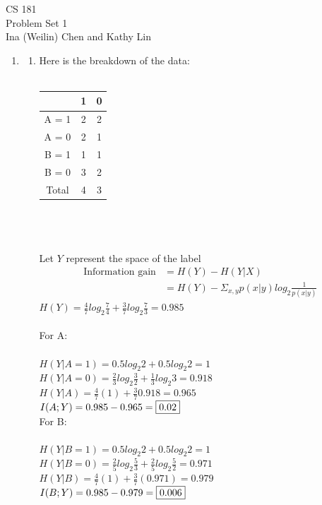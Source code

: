\documentclass[12pt]{article}
\begin{document}
\begin{center}
CS 181\\
Problem Set 1\\
Ina (Weilin) Chen and Kathy Lin
\end{center}

\begin{enumerate}

	\item 
		\begin{enumerate}
			\item Here is the breakdown of the data:\\\\
				\begin{tabular}{|c|c|c|}
        				\hline
        				~            & 1 & 0 \\ \hline
        				A = 1 & 2      & 2      \\ 
        				A = 0 & 2      & 1      \\
        				\hline
        				B = 1 & 1      & 1      \\ 
        				B = 0 & 3      & 2      \\
        				\hline
					Total & 4      & 3      \\
        				\hline
    				\end{tabular}
\\\\\\Let $Y$ represent the space of the label
				\begin{align*}\text{Information gain} &= H(Y) - H(Y|X)\\
							& = H(Y) -\Sigma_{x,y}p(x|y)log_{2}\frac{1}{p(x|y)}\end{align*}
				$H(Y) = \frac{4}{7}log_{2}\frac{7}{4} + \frac{3}{7}log_{2}\frac{7}{3} = 0.985$\\\\
				For A:\\\\
				$H(Y|A = 1) = 0.5log_{2}2 + 0.5log_{2}2 = 1$\\
				$H(Y|A = 0) = \frac{2}{3}log_{2}\frac{3}{2} + \frac{1}{3}log_{2}3 = 0.918$\\
				$H(Y|A) = \frac{4}{7}(1) + \frac{3}{7}0.918 = 0.965$\\
				$I(A ; Y) = 0.985 - 0.965 = \fbox{0.02}$\\

				For B:\\\\
				$H(Y|B = 1) = 0.5log_{2}2 + 0.5log_{2}2 = 1$\\
				$H(Y|B = 0) = \frac{2}{5}log_{2}\frac{5}{3} + \frac{2}{5}log_{2}\frac{5}{2} = 0.971$\\
				$H(Y|B) = \frac{4}{7}(1) + \frac{3}{7}(0.971) = 0.979$\\
				$I(B ; Y) = 0.985 - 0.979 = \fbox{0.006}$\\


\end{enumerate}
\end{enumerate}
\end{document}
